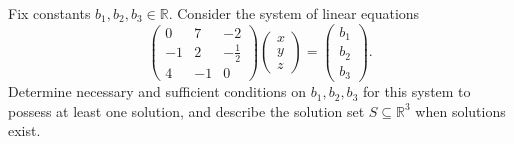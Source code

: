 \begin{exercise}
\label{exc:parametric_linear_system_solvability}
Fix constants $b_1, b_2, b_3 \in \mathbb{R}$. Consider the system of linear equations
\[
\begin{pmatrix}
0 & 7 & -2 \\
-1 & 2 & -\frac{1}{2} \\
4 & -1 & 0
\end{pmatrix}
\begin{pmatrix} x \\ y \\ z \end{pmatrix}
= \begin{pmatrix} b_1 \\ b_2 \\ b_3 \end{pmatrix}.
\]
Determine necessary and sufficient conditions on $b_1, b_2, b_3$ for this system to possess at least one solution, and describe the solution set $S \subseteq \mathbb{R}^3$ when solutions exist.
\end{exercise}

